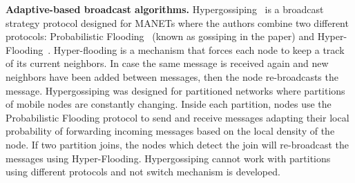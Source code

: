 \smallskip
\noindent
\textbf{Adaptive-based broadcast algorithms.}
%
Hypergossiping~\cite{hypergossiping} is a broadcast strategy protocol designed for MANETs where the authors combine two different protocols: Probabilistic Flooding~\cite{Ni1999} (known as gossiping in the paper) and Hyper-Flooding~\cite{Cheng2005}. 
Hyper-flooding is a mechanism that forces each node to keep a track of its current neighbors. In case the same message is received again and new neighbors have been added between messages, then the node re-broadcasts the message.
Hypergossiping was designed for partitioned networks where partitions of mobile nodes are constantly changing.
Inside each partition, nodes use the Probabilistic Flooding protocol to send and receive messages adapting their local probability of forwarding incoming messages based on the local density of  the node.
If two partition joins, the nodes which detect the join will re-broadcast the messages using Hyper-Flooding.
Hypergossiping cannot work with partitions using different protocols and not  switch mechanism is developed.

